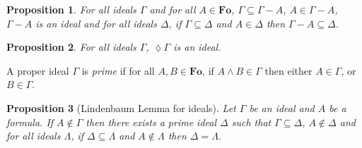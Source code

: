 \documentclass[draft]{article}
\newtheorem{proposition}{Proposition}
\def\Fo{\mathbf{Fo}}
\begin{document}
%
%
\begin{proposition}\label{Proposition:for:all:ideals:and:for:all:formulas:is:an:ideal:for:all:ideals:if:and:then}
%
%
For all ideals $\Gamma$ and for all $A{\in}\Fo$, $\Gamma{\subseteq}\Gamma{-}A$, $A{\in}\Gamma{-}A$, $\Gamma{-}A$ is an ideal and for all ideals $\Delta$, if $\Gamma{\subseteq}\Delta$ and $A{\in}\Delta$ then $\Gamma{-}A{\subseteq}\Delta$.
%
%
\end{proposition}
%
%
\begin{proposition}\label{Proposition:about:ideals:and:lozenge:operation}
%
%
For all ideals $\Gamma$, ${\lozenge}\Gamma$ is an ideal.
%
%
\end{proposition}
%
%
A proper ideal $\Gamma$ is {\em prime}\/ if for all $A,B{\in}\Fo$, if $A{\wedge}B{\in}\Gamma$ then either $A{\in}\Gamma$, or $B{\in}\Gamma$.
%
%
\begin{proposition}[Lindenbaum Lemma for ideals]\label{Proposition:let:be:an:ideal:and:be:a:formula:if:then:there:exists:a:prime:ideal:such:that:and:for:all:ideals:if:and:then}
%
%
Let $\Gamma$ be an ideal and $A$ be a formula.
If $A{\not\in}\Gamma$ then there exists a prime ideal $\Delta$ such that $\Gamma{\subseteq}\Delta$, $A{\not\in}\Delta$ and for all ideals $\Lambda$, if $\Delta{\subseteq}\Lambda$ and $A{\not\in}\Lambda$ then $\Delta{=}\Lambda$.
%
%
\end{proposition}
%
%
%
%
%
%
%
%
%
%
%
%
%
%
%
%
%
%
%
%
%
%
%
%
%
%
\end{document}
